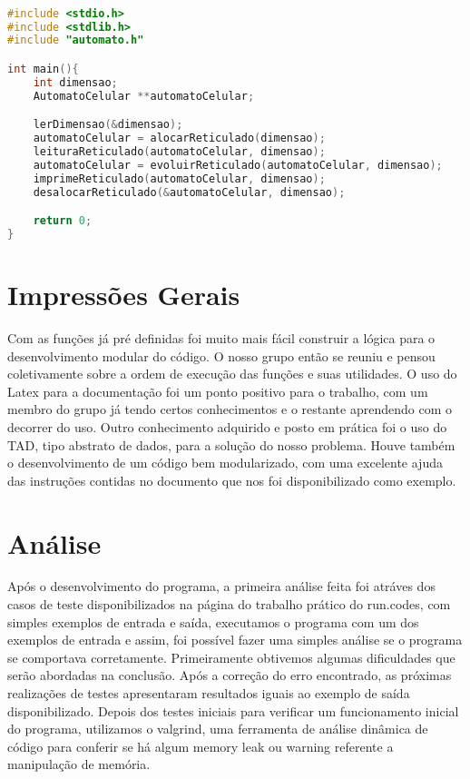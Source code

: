 \documentclass{article}
\begin{document}
\begin{lstlisting}[caption={função main},label={lst:cod11},language=C]

#include <stdio.h>
#include <stdlib.h>
#include "automato.h"

int main(){
    int dimensao;
    AutomatoCelular **automatoCelular;

    lerDimensao(&dimensao);
    automatoCelular = alocarReticulado(dimensao);
    leituraReticulado(automatoCelular, dimensao);
    automatoCelular = evoluirReticulado(automatoCelular, dimensao);
    imprimeReticulado(automatoCelular, dimensao);
    desalocarReticulado(&automatoCelular, dimensao);

    return 0;
}

\end{lstlisting}

\clearpage


\section{Impressões Gerais}

Com as funções já pré definidas foi muito mais fácil construir a lógica para o desenvolvimento modular do código. O nosso grupo então se reuniu e pensou coletivamente sobre a ordem de execução das funções e suas utilidades. O uso do Latex para a documentação foi um ponto positivo para o trabalho, com um membro do grupo já tendo certos conhecimentos e o restante aprendendo com o decorrer do uso.
Outro conhecimento adquirido e posto em prática foi o uso do TAD, tipo abstrato de dados, para a solução do nosso problema. Houve também o desenvolvimento de um código bem modularizado, com uma excelente ajuda das instruções contidas no documento que nos foi disponibilizado como exemplo.

\section{Análise}

Após o desenvolvimento do programa, a primeira análise feita foi atráves dos casos de teste disponibilizados na página do trabalho prático do run.codes, com simples exemplos de entrada e saída, executamos o programa com um dos exemplos de entrada e assim, foi possível fazer uma simples análise se o programa se comportava corretamente. Primeiramente obtivemos algumas dificuldades que serão abordadas na conclusão. Após a correção do erro encontrado, as próximas realizações de testes apresentaram resultados iguais ao exemplo de saída disponibilizado.
Depois dos testes iniciais para verificar um funcionamento inicial do programa, utilizamos o valgrind, uma ferramenta de análise dinâmica de código para conferir se há algum memory leak ou warning referente a manipulação de memória.
\end{document}
